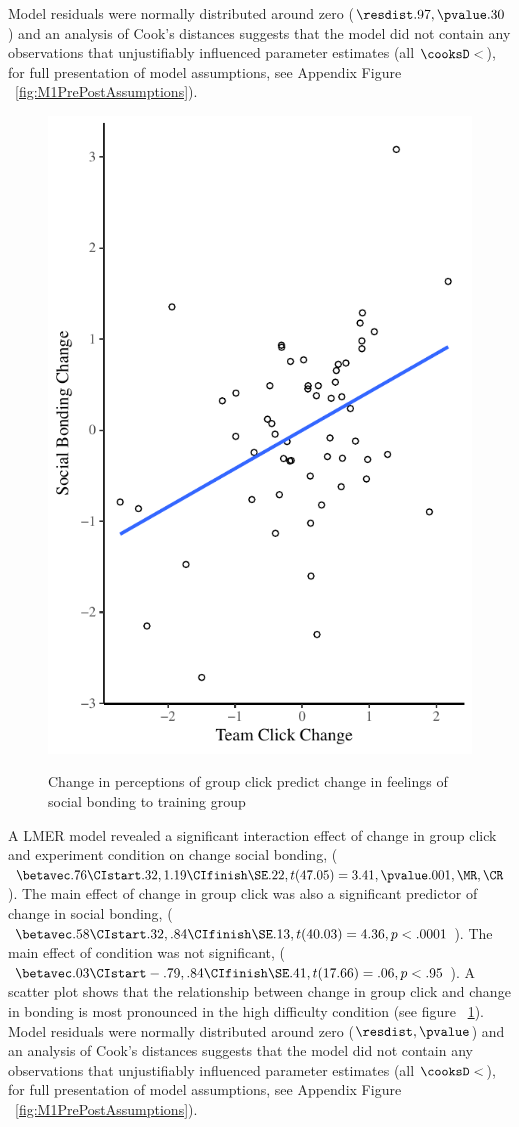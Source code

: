 Model residuals were normally distributed around zero ($\resdist .97 , \pvalue .30$) and an analysis of Cook's distances suggests that the model did not contain any observations that unjustifiably influenced parameter estimates (all $\cooksD < $), for full presentation of model assumptions, see Appendix Figure ~\ref{fig:M1PrePostAssumptions}).






\begin{figure}
  \centering
    \includegraphics[width=0.5\linewidth,keepaspectratio] {images/groupClickBondingChangeCondition}
    \label{fig:groupClickBondingChangeCondition}
    \caption{Change in perceptions of group click predict change in feelings of social bonding to training group}
\end{figure}

A LMER model revealed a significant interaction effect of change in group click and experiment condition on change social bonding, ($\betavec .76 \CIstart .32, 1.19 \CIfinish \SE.22, t(47.05) = 3.41, \pvalue .001, \MR , \CR $).  The main effect of change in group click was also a significant predictor of change in social bonding, ($\betavec .58 \CIstart .32, .84 \CIfinish \SE.13, t(40.03) = 4.36, p < .0001 $).  The main effect of condition was not significant, ($\betavec .03 \CIstart -.79, .84 \CIfinish \SE.41, t(17.66) = .06, p < .95 $).  A scatter plot shows that the relationship between change in group click and change in bonding is most pronounced in the high difficulty condition (see figure ~\ref{fig:groupClickBondingChangeCondition}). Model residuals were normally distributed around zero ($\resdist , \pvalue $) and an analysis of Cook's distances suggests that the model did not contain any observations that unjustifiably influenced parameter estimates (all $\cooksD < $), for full presentation of model assumptions, see Appendix Figure ~\ref{fig:M1PrePostAssumptions}).

